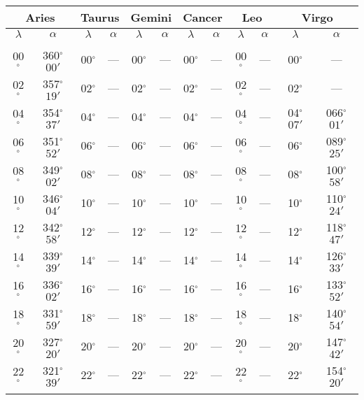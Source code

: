\begin{table}
\centering
{\small \begin{tabular}{cc|cc|cc|cc|cc|cc}
\multicolumn{2}{c}{Aries}\vline & \multicolumn{2}{c}{Taurus} \vline& \multicolumn{2}{c}{Gemini} \vline& \multicolumn{2}{c}{Cancer}\vline &
\multicolumn{2}{c}{Leo}\vline & \multicolumn{2}{c}{Virgo}\\\hline
$\lambda$& $\alpha$& $\lambda$& $\alpha$& $\lambda$& $\alpha$& $\lambda$& $\alpha$& $\lambda$& $\alpha$& $\lambda$& $\alpha$\\\hline
&&&&&&&&&&&\\[-2ex]
00$^\circ$ & 360$^\circ$$00'$ & 00$^\circ$ & --- & 00$^\circ$ & --- & 00$^\circ$ & --- & 00$^\circ$ & --- & 00$^\circ$ & ---\\
02$^\circ$ & 357$^\circ$$19'$ & 02$^\circ$ & --- & 02$^\circ$ & --- & 02$^\circ$ & --- & 02$^\circ$ & --- & 02$^\circ$ & ---\\
04$^\circ$ & 354$^\circ$$37'$ & 04$^\circ$ & --- & 04$^\circ$ & --- & 04$^\circ$ & --- & 04$^\circ$ & --- & 04$^\circ$$07'$ & 066$^\circ$$01'$\\
06$^\circ$ & 351$^\circ$$52'$ & 06$^\circ$ & --- & 06$^\circ$ & --- & 06$^\circ$ & --- & 06$^\circ$ & --- & 06$^\circ$ & 089$^\circ$$25'$\\
08$^\circ$ & 349$^\circ$$02'$ & 08$^\circ$ & --- & 08$^\circ$ & --- & 08$^\circ$ & --- & 08$^\circ$ & --- & 08$^\circ$ & 100$^\circ$$58'$\\
10$^\circ$ & 346$^\circ$$04'$ & 10$^\circ$ & --- & 10$^\circ$ & --- & 10$^\circ$ & --- & 10$^\circ$ & --- & 10$^\circ$ & 110$^\circ$$24'$\\
12$^\circ$ & 342$^\circ$$58'$ & 12$^\circ$ & --- & 12$^\circ$ & --- & 12$^\circ$ & --- & 12$^\circ$ & --- & 12$^\circ$ & 118$^\circ$$47'$\\
14$^\circ$ & 339$^\circ$$39'$ & 14$^\circ$ & --- & 14$^\circ$ & --- & 14$^\circ$ & --- & 14$^\circ$ & --- & 14$^\circ$ & 126$^\circ$$33'$\\
16$^\circ$ & 336$^\circ$$02'$ & 16$^\circ$ & --- & 16$^\circ$ & --- & 16$^\circ$ & --- & 16$^\circ$ & --- & 16$^\circ$ & 133$^\circ$$52'$\\
18$^\circ$ & 331$^\circ$$59'$ & 18$^\circ$ & --- & 18$^\circ$ & --- & 18$^\circ$ & --- & 18$^\circ$ & --- & 18$^\circ$ & 140$^\circ$$54'$\\
20$^\circ$ & 327$^\circ$$20'$ & 20$^\circ$ & --- & 20$^\circ$ & --- & 20$^\circ$ & --- & 20$^\circ$ & --- & 20$^\circ$ & 147$^\circ$$42'$\\
22$^\circ$ & 321$^\circ$$39'$ & 22$^\circ$ & --- & 22$^\circ$ & --- & 22$^\circ$ & --- & 22$^\circ$ & --- & 22$^\circ$ & 154$^\circ$$20'$\\
$$
\end{tabular}}
\end{table}
